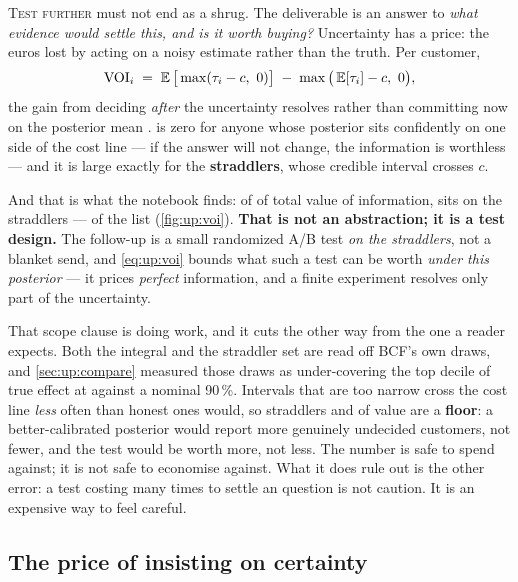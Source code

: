 \textsc{Test further} must not end as a shrug. The deliverable is an answer to \emph{what evidence
would settle this, and is it worth buying?} Uncertainty has a price: the euros lost by acting on a
noisy estimate rather than the truth. Per customer,
%
\begin{equation}
  \text{VOI}_i \;=\; \E\big[\max(\tau_i - c,\ 0)\big] \;-\; \max\big(\E[\tau_i] - c,\ 0\big) ,
  \label{eq:up:voi}
\end{equation}
%
the gain from deciding \emph{after} the uncertainty resolves rather than committing now on the
posterior mean \citep{raiffa1961}.  is zero for anyone whose posterior sits
confidently on one side of the cost line --- if the answer will not change, the information is
worthless --- and it is large exactly for the \textbf{straddlers}, whose credible interval crosses
$c$.

And that is what the notebook finds: of \eur{\nbOneVoiTotal} of total value of information,
\eur{\nbOneVoiStraddlers} sits on the \nbOneNStraddlers{} straddlers --- \pc{\nbOneStraddlerShare}
of the list (\cref{fig:up:voi}). \textbf{That is not an abstraction; it is a test design.} The
follow-up is a small randomized A/B test \emph{on the straddlers}, not a blanket send, and
\cref{eq:up:voi} bounds what such a test can be worth \emph{under this posterior} --- it prices
\emph{perfect} information, and a finite experiment resolves only part of the uncertainty.

That scope clause is doing work, and it cuts the other way from the one a reader expects. Both the
integral and the straddler set are read off BCF's own draws, and \cref{sec:up:compare} measured those
draws as under-covering the top decile of true effect at \pc{\nbOneBcfTopDec} against a nominal
90\,\%. Intervals that are too narrow cross the cost line \emph{less} often than honest ones would,
so \nbOneNStraddlers{} straddlers and \eur{\nbOneVoiStraddlers} of value are a \textbf{floor}: a
better-calibrated posterior would report more genuinely undecided customers, not fewer, and the test
would be worth more, not less. The number is safe to spend against; it is not safe to economise
against. What it does rule out is the other error: a test costing many times
\eur{\nbOneVoiStraddlers} to settle an \eur{\nbOneVoiStraddlers} question is not caution. It is an
expensive way to feel careful.



\subsection*{The price of insisting on certainty}

